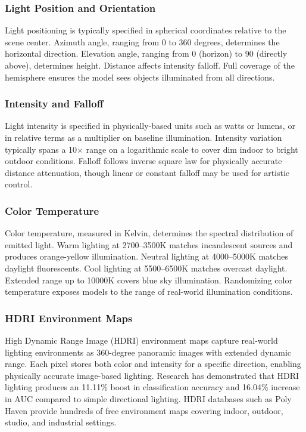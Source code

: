 \subsubsection{Light Position and Orientation}

Light positioning is typically specified in spherical coordinates relative to the scene center. Azimuth angle, ranging from 0 to 360 degrees, determines the horizontal direction. Elevation angle, ranging from 0 (horizon) to 90 (directly above), determines height. Distance affects intensity falloff. Full coverage of the hemisphere ensures the model sees objects illuminated from all directions.

\subsubsection{Intensity and Falloff}

Light intensity is specified in physically-based units such as watts or lumens, or in relative terms as a multiplier on baseline illumination. Intensity variation typically spans a 10$\times$ range on a logarithmic scale to cover dim indoor to bright outdoor conditions. Falloff follows inverse square law for physically accurate distance attenuation, though linear or constant falloff may be used for artistic control.

\subsubsection{Color Temperature}

Color temperature, measured in Kelvin, determines the spectral distribution of emitted light. Warm lighting at 2700--3500K matches incandescent sources and produces orange-yellow illumination. Neutral lighting at 4000--5000K matches daylight fluorescents. Cool lighting at 5500--6500K matches overcast daylight. Extended range up to 10000K covers blue sky illumination. Randomizing color temperature exposes models to the range of real-world illumination conditions.

\subsubsection{HDRI Environment Maps}

High Dynamic Range Image (HDRI) environment maps capture real-world lighting environments as 360-degree panoramic images with extended dynamic range. Each pixel stores both color and intensity for a specific direction, enabling physically accurate image-based lighting. Research has demonstrated that HDRI lighting produces an 11.11\% boost in classification accuracy and 16.04\% increase in AUC compared to simple directional lighting. HDRI databases such as Poly Haven provide hundreds of free environment maps covering indoor, outdoor, studio, and industrial settings.

